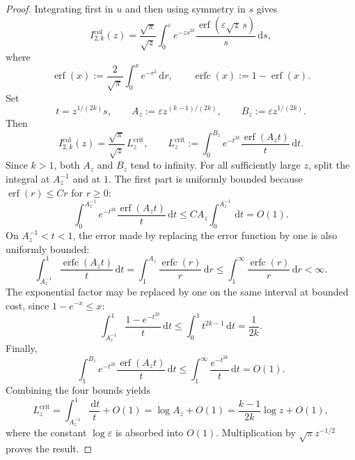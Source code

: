 \documentclass[11pt]{amsart}
\numberwithin{equation}{section}
\theoremstyle{definition}
\theoremstyle{remark}
\DeclareMathOperator{\erf}{erf}
\DeclareMathOperator{\erfc}{erfc}
\newcommand{\dd}{\,\mathrm{d}}
\newcommand{\eps}{\varepsilon}
\begin{document}
\begin{proof}
Integrating first in $u$ and then using symmetry in $s$ gives
\[
 I^{\mathrm{col}}_{2,k}(z)
 =\frac{\sqrt\pi}{\sqrt z}\int_0^\eps
 e^{-zs^{2k}}\frac{\erf(\eps\sqrt z\,s)}{s}\dd s,
\]
where
\[
 \erf(x):=\frac{2}{\sqrt\pi}\int_0^x e^{-r^2}\dd r,
 \qquad
 \erfc(x):=1-\erf(x).
\]
Set
\[
 t=z^{1/(2k)}s,
 \qquad
 A_z:=\eps z^{(k-1)/(2k)},
 \qquad
 B_z:=\eps z^{1/(2k)}.
\]
Then
\[
 I^{\mathrm{col}}_{2,k}(z)=\frac{\sqrt\pi}{\sqrt z}\,L_z^{\mathrm{crit}},
 \qquad
 L_z^{\mathrm{crit}}:=\int_0^{B_z}
 e^{-t^{2k}}\frac{\erf(A_z t)}{t}\dd t.
\]
Since $k>1$, both $A_z$ and $B_z$ tend to infinity.  For all sufficiently
large $z$, split the integral at $A_z^{-1}$ and at $1$.  The first part is
uniformly bounded because $\erf(r)\le C r$ for $r\ge0$:
\[
 \int_0^{A_z^{-1}}
 e^{-t^{2k}}\frac{\erf(A_z t)}{t}\dd t
 \le C A_z\int_0^{A_z^{-1}}\dd t=O(1).
\]
On $A_z^{-1}<t<1$, the error made by replacing the error function by one is
also uniformly bounded:
\[
 \int_{A_z^{-1}}^1
 \frac{\erfc(A_z t)}{t}\dd t
 =\int_1^{A_z}\frac{\erfc(r)}{r}\dd r
 \le\int_1^\infty\frac{\erfc(r)}{r}\dd r<\infty.
\]
The exponential factor may be replaced by one on the same interval at bounded
cost, since $1-e^{-x}\le x$:
\[
 \int_{A_z^{-1}}^1
 \frac{1-e^{-t^{2k}}}{t}\dd t
 \le\int_0^1t^{2k-1}\dd t=\frac1{2k}.
\]
Finally,
\[
 \int_1^{B_z}e^{-t^{2k}}
 \frac{\erf(A_z t)}{t}\dd t
 \le\int_1^\infty\frac{e^{-t^{2k}}}{t}\dd t=O(1).
\]
Combining the four bounds yields
\[
 L_z^{\mathrm{crit}}=\int_{A_z^{-1}}^1\frac{\dd t}{t}+O(1)
 =\log A_z+O(1)
 =\frac{k-1}{2k}\log z+O(1),
\]
where the constant $\log\eps$ is absorbed into $O(1)$.  Multiplication by
$\sqrt\pi z^{-1/2}$ proves the result.
\end{proof}
\end{document}
